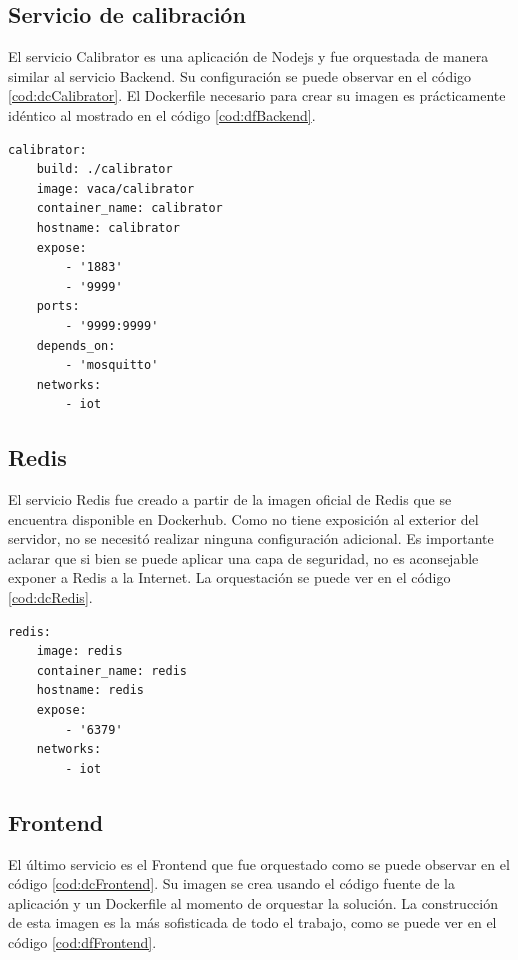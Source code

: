\subsection{Servicio de calibración}

El servicio Calibrator es una aplicación de Nodejs y fue orquestada de manera similar al servicio Backend.
Su configuración se puede observar en el código \ref{cod:dcCalibrator}.
El Dockerfile necesario para crear su imagen es prácticamente idéntico al mostrado en el código \ref{cod:dfBackend}.

\begin{lstlisting}[label=cod:dcCalibrator,caption=Orquestación del servicio Calibrator.]
calibrator:
	build: ./calibrator
	image: vaca/calibrator
	container_name: calibrator
	hostname: calibrator
	expose: 
		- '1883'
		- '9999'
	ports:
		- '9999:9999'
	depends_on: 
		- 'mosquitto'
	networks: 
		- iot
\end{lstlisting}

\subsection{Redis}

El servicio Redis fue creado a partir de la imagen oficial de Redis que se encuentra disponible en Dockerhub. \citep{contrib:redis}
Como no tiene exposición al exterior del servidor, no se necesitó realizar ninguna configuración adicional.
Es importante aclarar que si bien se puede aplicar una capa de seguridad, no es aconsejable exponer a Redis a la Internet.
La orquestación se puede ver en el código \ref{cod:dcRedis}.

\begin{lstlisting}[label=cod:dcRedis,caption=Orquestación del servicio Redis.]
redis:
	image: redis
	container_name: redis
	hostname: redis
	expose:
		- '6379'
	networks: 
		- iot
\end{lstlisting}

\newpage

\subsection{Frontend}

El último servicio es el Frontend que fue orquestado como se puede observar en el código \ref{cod:dcFrontend}.
Su imagen se crea usando el código fuente de la aplicación y un Dockerfile al momento de orquestar la solución.
La construcción de esta imagen es la más sofisticada de todo el trabajo, como se puede ver en el código \ref{cod:dfFrontend}.

